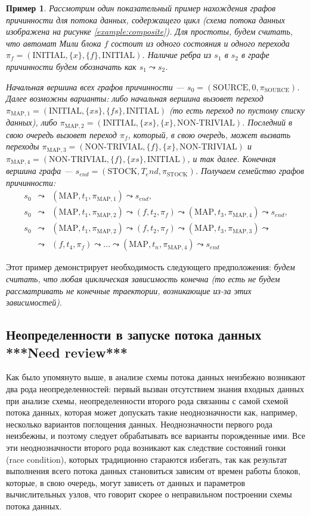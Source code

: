 \documentclass[10pt,a4paper]{article}
\newtheorem{example}{Пример}
\newcommand{\stock}{\text{STOCK}}
\newcommand{\source}{\text{SOURCE}}
\newcommand{\initial}{\text{INITIAL}}
\newcommand{\nontrivial}{\text{NON-TRIVIAL}}
\newcommand{\map}{\text{MAP}}
\begin{document}
  \begin{example}
  \label{map_example}
  Рассмотрим один показательный пример нахождения графов причинности для потока данных, содержащего цикл (схема потока данных изображена на рисунке \ref{example:composite}).
  Для простоты, будем считать, что автомат Мили блока $f$ состоит из одного состояния и одного перехода $\pi_f = (\initial, \{x\}, \{f\}, \initial)$.  
  Наличие ребра из $s_1$ в $s_2$ в графе причинности будем обозначать как $s_1 \leadsto s_2$.
  
  Начальная вершина всех графов причинности --- $s_0 = (\source, 0, \pi_{\source})$. Далее возможны варианты: либо начальная вершина вызовет переход
  $\pi_{\map, 1} = (\initial, \{xs\}, \{fs\}, \initial)$ (то есть переход по пустому списку данных), либо $\pi_{\map, 2} = (\initial, \{xs\}, \{x\}, \nontrivial)$.
  Последний в свою очередь вызовет переход $\pi_f$, который, в свою очередь, может вызвать переходы
  $\pi_{\map, 3} = (\nontrivial, \{f\}, \{x\}, \nontrivial)$ и $\pi_{\map, 4} = (\nontrivial, \{f\}, \{xs\}, \initial)$, и так далее.
  Конечная вершина графа --- $s_{end} = (\stock, T_end, \pi_{\stock})$.
  Получаем семейство графов причинности:
  \begin{eqnarray*}
    s_0 & \leadsto & (\map, t_1, \pi_{\map, 1}) \leadsto s_{end}, \\
    s_0 & \leadsto & (\map, t_1, \pi_{\map, 2}) \leadsto (f, t_2, \pi_f) \leadsto (\map, t_3, \pi_{\map, 4}) \leadsto s_{end}, \\
    s_0 & \leadsto & (\map, t_1, \pi_{\map, 2}) \leadsto (f, t_2, \pi_f) \leadsto (\map, t_3, \pi_{\map, 3}) \leadsto \\
    & \leadsto & (f, t_4, \pi_f) \leadsto \dots \leadsto (\map, t_n, \pi_{\map, 4}) \leadsto s_{end}
  \end{eqnarray*}
  
  \end{example}
  
  Этот пример демонстрирует необходимость следующего предположения:
  \textit{будем считать, что любая циклическая зависимость конечна (то есть не будем рассматривать не конечные траектории, возникающие из-за этих зависимостей)}.
  
\subsection{Неопределенности в запуске потока данных \textbf{***Need review***}}
  Как было упомянуто выше, в анализе схемы потока данных неизбежно возникают два рода неопределенностей: первый вызван отсутствием знания входных данных при анализе схемы,
  неопределенности второго рода связанны с самой схемой потока данных, которая может допускать такие неоднозначности как, например, несколько вариантов поглощения данных.
  Неоднозначности первого рода неизбежны, и поэтому следует обрабатывать все варианты порожденные ими.
  Все эти неоднозначности второго рода возникают как следствие состояний гонки (race condition), которых традиционно стараются избегать,
  так как результат выполнения всего потока данных становиться зависим от времен работы блоков, которые, в свою очередь, могут зависеть от данных и
  параметров вычислительных узлов, что говорит скорее о неправильном построении схемы потока данных.
  
\end{document}
